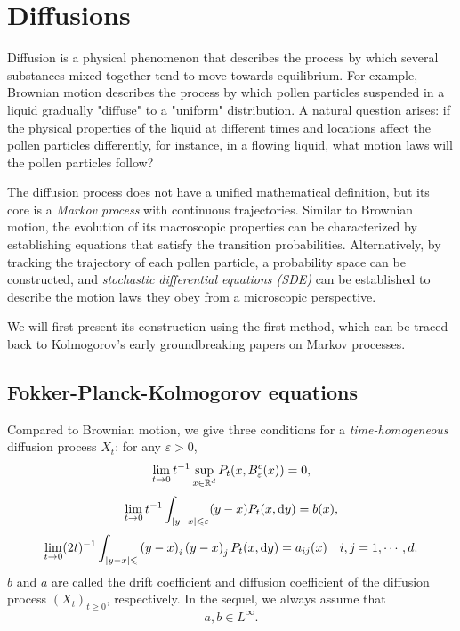 \section{Diffusions}
Diffusion is a physical phenomenon that describes the process by which several substances mixed together tend to move towards equilibrium. For example, Brownian motion describes the process by which pollen particles suspended in a liquid gradually "diffuse" to a "uniform" distribution. A natural question arises: if the physical properties of the liquid at different times and locations affect the pollen particles differently, for instance, in a flowing liquid, what motion laws will the pollen particles follow?

The diffusion process does not have a unified mathematical definition, but its core is a {\em Markov process} with continuous trajectories. Similar to Brownian motion, the evolution of its macroscopic properties can be characterized by establishing equations that satisfy the transition probabilities. Alternatively, by tracking the trajectory of each pollen particle, a probability space can be constructed, and {\em stochastic differential equations (SDE)} can be established to describe the motion laws they obey from a microscopic perspective. 

We will first present its construction using the first method, which can be traced back to Kolmogorov's early groundbreaking papers on Markov processes.



\subsection{Fokker-Planck-Kolmogorov equations}
Compared to Brownian motion, we give three conditions for a {\em time-homogeneous}  diffusion process \(X_t\): for any \( \varepsilon > 0 \),
\begin{equation}\label{eq:TF1}
    \lim_{t\to0} t^{-1}\sup_{x\in{\mathbb R}^d} P_{t}(x, B^c_\varepsilon(x)) = 0,
\end{equation}
\begin{equation}\label{eq:TF2}
    \lim_{t \to 0} t^{-1}\int_{|y-x|\leqslant\varepsilon} (y-x) P_t(x, \text{\rm{d}} y)=b(x), 
\end{equation}
\begin{equation}\label{eq:TF3}
    \lim_{t \to 0} ({2t})^{-1} \int_{|y-x|\leqslant} \left(y-x\right)_{i}\left(y-x\right)_{j}P_t(x,\text{\rm{d}} y) = a_{ij}(x)\quad i,j=1,\cdots,d.
\end{equation}
\( b \) and \( a \) are called the drift coefficient and diffusion coefficient of the diffusion process \( (X_t)_{t\geq 0} \), respectively. In the sequel, we always assume that 
\[
a, b\in L^\infty. 
\]

